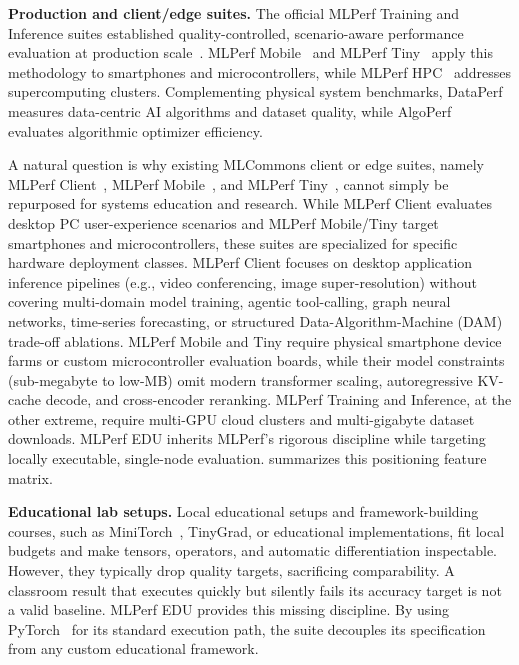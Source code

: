 \documentclass[10pt,twocolumn]{article}
\begin{document}
\textbf{Production and client/edge suites.} The official MLPerf Training and Inference suites established quality-controlled, scenario-aware performance evaluation at production scale~\citep{mattson2020,reddi2020mlperf}. MLPerf Mobile~\citep{ignatov2021mlperf} and MLPerf Tiny~\citep{banbury2021mlperf} apply this methodology to smartphones and microcontrollers, while MLPerf HPC~\citep{farrell2021mlperf} addresses supercomputing clusters. Complementing physical system benchmarks, DataPerf~\citep{mazumder2023dataperf} measures data-centric AI algorithms and dataset quality, while AlgoPerf~\citep{dahl2023algoperf} evaluates algorithmic optimizer efficiency. 

A natural question is why existing MLCommons client or edge suites, namely MLPerf Client~\citep{mlcommons2024client}, MLPerf Mobile~\citep{ignatov2021mlperf}, and MLPerf Tiny~\citep{banbury2021mlperf}, cannot simply be repurposed for systems education and research. While MLPerf Client evaluates desktop PC user-experience scenarios and MLPerf Mobile/Tiny target smartphones and microcontrollers, these suites are specialized for specific hardware deployment classes. MLPerf Client focuses on desktop application inference pipelines (e.g., video conferencing, image super-resolution) without covering multi-domain model training, agentic tool-calling, graph neural networks, time-series forecasting, or structured Data-Algorithm-Machine (DAM) trade-off ablations. MLPerf Mobile and Tiny require physical smartphone device farms or custom microcontroller evaluation boards, while their model constraints (sub-megabyte to low-MB) omit modern transformer scaling, autoregressive KV-cache decode, and cross-encoder reranking. MLPerf Training and Inference, at the other extreme, require multi-GPU cloud clusters and multi-gigabyte dataset downloads. MLPerf EDU inherits MLPerf's rigorous discipline while targeting locally executable, single-node evaluation.  summarizes this positioning feature matrix.

\textbf{Educational lab setups.} Local educational setups and framework-building courses, such as MiniTorch~\citep{rush2021}, TinyGrad, or educational implementations, fit local budgets and make tensors, operators, and automatic differentiation inspectable. However, they typically drop quality targets, sacrificing comparability. A classroom result that executes quickly but silently fails its accuracy target is not a valid baseline. MLPerf EDU provides this missing discipline. By using PyTorch~\citep{paszke2019pytorch} for its standard execution path, the suite decouples its specification from any custom educational framework.
\end{document}
